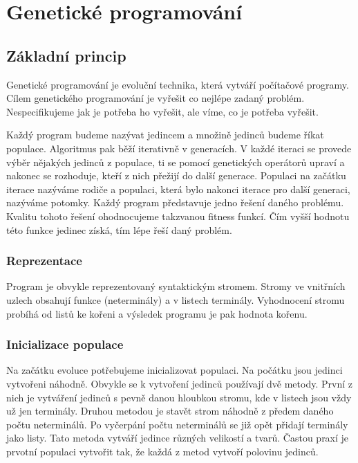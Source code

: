 \chapter{Genetické programování}

\section{Základní princip}
Genetické programování je evoluční technika, která vytváří počítačové programy. Cílem genetického programování je vyřešit co nejlépe zadaný problém.
Nespecifikujeme jak je potřeba ho vyřešit, ale víme, co je potřeba vyřešit.
\par
Každý program budeme nazývat jedincem a množině jedinců budeme říkat populace. Algoritmus pak běží iterativně v generacích. 
V každé iteraci se provede výběr nějakých jedinců z populace, ti se pomocí genetických operátorů upraví a nakonec se rozhoduje, kteří z nich přežijí do další generace.
Populaci na začátku iterace nazýváme rodiče a populaci, která bylo nakonci iterace pro další generaci, nazýváme potomky.
Každý program představuje jedno řešení daného problému. Kvalitu tohoto řešení ohodnocujeme takzvanou fitness funkcí. Čím vyšší hodnotu této funkce jedinec získá, tím lépe řeší daný problém.
\subsection{Reprezentace}

Program je obvykle reprezentovaný syntaktickým stromem. Stromy ve vnitřních uzlech obsahují funkce (neterminály) a v listech terminály.
Vyhodnocení stromu probíhá od listů ke kořeni a výsledek programu je pak hodnota kořenu.

\subsection{Inicializace populace}
Na začátku evoluce potřebujeme inicializovat populaci. Na počátku jsou jedinci vytvořeni náhodně. Obvykle se k vytvoření jedinců používají dvě metody.
První z nich je vytváření jedinců s pevně danou hloubkou stromu, kde v listech jsou vždy už jen terminály. Druhou metodou je stavět strom náhodně z předem daného počtu neterminálů.
Po vyčerpání počtu neterminálů se již opět přidají terminály jako listy. Tato metoda vytváří jedince různých velikostí a tvarů.
Častou praxí je prvotní populaci vytvořit tak, že každá z metod vytvoří polovinu jedinců. 

